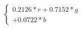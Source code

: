 \documentclass[border=2pt]{standalone}
\begin{document}
\begin{varwidth}{\linewidth}
\[
  \left \{
    \begin{array}{c}
      0.2126 * r + 0.7152 * g \\
      + 0.0722 * b
    \end{array}
  \right .
\]
\end{varwidth}
\end{document}
